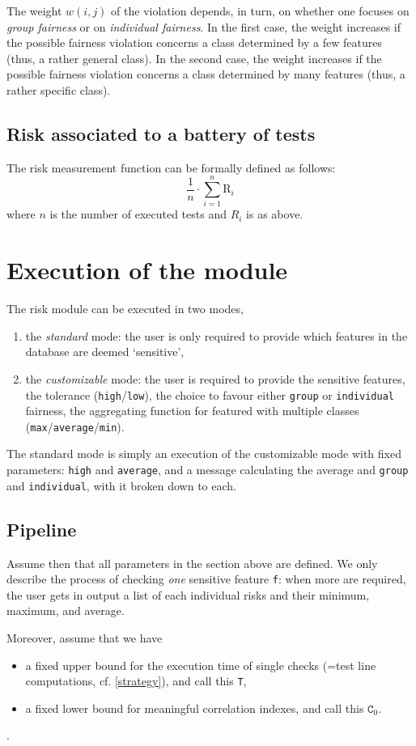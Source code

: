 \documentclass{article}
\begin{document}
The weight $w(i,j)$  of the violation depends, in turn, on whether one focuses on {\it group fairness} or on {\it individual fairness}. In the first case, the weight increases if the possible fairness violation concerns a class determined by a few features (thus, a rather general class). In the second case, the weight increases if the possible fairness violation concerns a class determined by many features (thus, a rather specific class).

\subsection{Risk associated to a battery of tests}
The risk measurement function can be formally defined as follows:
\[\frac{1}{n}\cdot \sum ^n_{i=1}\mathrm{R}_i\]
where $n$ is the number of executed tests and $R_i$ is as above.

\section{Execution of the module}
The risk module can be executed in two modes,
\begin{enumerate}
\item the \emph{standard} mode: the user is only required to provide which features in the database are deemed `sensitive',
\item the \emph{customizable} mode: the user is required to provide the sensitive features, the tolerance (\texttt{high}/\texttt{low}), the choice to favour either \texttt{group} or \texttt{individual} fairness, the aggregating function for featured with multiple classes (\texttt{max}/\texttt{average}/\texttt{min}).
\end{enumerate}
The standard mode is simply an execution of the customizable mode with fixed parameters: \texttt{high} and \texttt{average}, and a message calculating the average and \texttt{group} and \texttt{individual}, with it broken down to each.

\subsection{Pipeline}
Assume then that all parameters in the section above are defined. We only describe the process of checking \emph{one} sensitive feature \texttt{f}: when more are required, the user gets in output a list of each individual risks and their minimum, maximum, and average.

Moreover, assume that we have
\begin{itemize}
\item a fixed upper bound for the execution time of single checks (=test line computations, cf. \ref{strategy}), and call this \texttt{T},
\item a fixed lower bound for meaningful correlation indexes, and call this $\texttt{C}_0$.
\end{itemize}.
\end{document}
